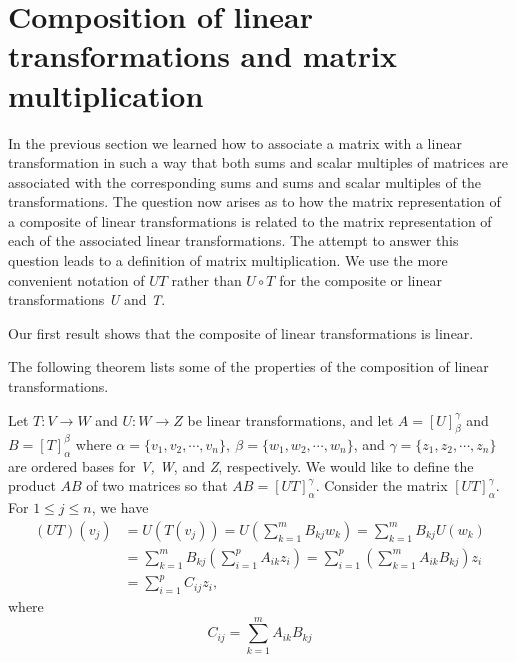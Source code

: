 \section{Composition of linear transformations and matrix multiplication}
In the previous section we learned how to associate a matrix with a linear transformation in such a way that both sums and scalar multiples of matrices are associated with the corresponding sums and sums and scalar multiples of the transformations. The question now arises as to how the matrix representation of a composite of linear transformations is related to the matrix representation of each of the associated linear transformations. The attempt to answer this question leads to a definition of matrix multiplication. We use the more convenient notation of $UT$ rather than $U \circ T$ for the composite or linear transformations \textit{U} and \textit{T}.

Our first result shows that the composite of linear transformations is linear.


The following theorem lists some of the properties of the composition of linear transformations.



Let $T : V \longrightarrow W$ and $U : W \longrightarrow Z$ be linear transformations, and let $A = [U]_\beta^\gamma$ and $B = [T]_\alpha^\beta$ where $\alpha = \{v_1, v_2, \cdots, v_n\},~ \beta = \{w_1, w_2, \cdots, w_n\}$, and $\gamma = \{z_1, z_2, \cdots, z_n\}$ are ordered bases for \textit{V, W}, and \textit{Z}, respectively. We would like to define the product $AB$ of two matrices so that $AB = [UT]_\alpha^\gamma$. Consider the matrix $[UT]_\alpha^\gamma$. For $1 \le j \le n$, we have
\begin{align*}
  (UT)(v_j) &= U(T(v_j)) = U(\sum_{k = 1}^m B_{kj} w_k) = \sum_{k = 1}^m B_{kj} U(w_k)\\
            &= \sum_{k = 1}^m B_{kj} (\sum_{i = 1}^p A_{ik} z_i) = \sum_{i = 1}^p(\sum_{k = 1}^m A_{ik} B_{kj})z_i\\
            &= \sum_{i = 1}^p C_{ij} z_i,
\end{align*}
where
\[C_{ij} = \sum_{k = 1}^m A_{ik} B_{kj}\]

